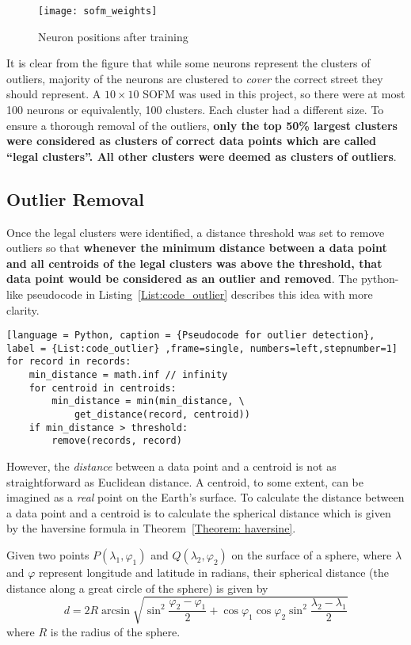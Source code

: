 \begin{figure}[h]
\texttt{[image: sofm\_weights]}
\centering
\caption{Neuron positions after training}\label{Fig:sofm_weights}
\end{figure}

It is clear from the figure that while some neurons represent the clusters of outliers, majority of the neurons are clustered to \emph{cover} the correct street they should represent. A $10\times10$ SOFM was used in this project, so there were at most 100 neurons or equivalently, 100 clusters. Each cluster had a different size. To ensure a thorough removal of the outliers, \textbf{only the top 50\% largest clusters were considered as clusters of correct data points which are called ``legal clusters''. All other clusters were deemed as clusters of outliers}. 

\subsection{Outlier Removal}\label{Subsec:outlier_removal}
Once the legal clusters were identified, a distance threshold was set to remove outliers so that \textbf{whenever the minimum distance between a data point and all centroids of the legal clusters was above the threshold, that data point would be considered as an outlier and removed}. The python-like pseudocode in Listing~\ref{List:code_outlier} describes this idea with more clarity.

\begin{lstlisting}[language = Python, caption = {Pseudocode for outlier detection}, label = {List:code_outlier} ,frame=single, numbers=left,stepnumber=1]
for record in records:
	min_distance = math.inf // infinity
	for centroid in centroids:
		min_distance = min(min_distance, \
			get_distance(record, centroid))
	if min_distance > threshold:
		remove(records, record)
\end{lstlisting}

However, the \emph{distance} between a data point and a centroid is not as straightforward as Euclidean distance. A centroid, to some extent, can be imagined as a \emph{real} point on the Earth's surface. To calculate the distance between a data point and a centroid is to calculate the spherical distance which is given by the haversine formula in Theorem~\ref{Theorem: haversine}. 

\begin{theorem}\label{Theorem: haversine}
Given two points $P(\lambda_1,\varphi_1)$ and $Q(\lambda_2,\varphi_2)$ on the surface of a sphere, where $\lambda$ and $\varphi$ represent longitude and latitude in radians, their spherical distance (the distance along a great circle of the sphere) is given by\cite{FI06}
\begin{equation}
d = 2R\arcsin{\sqrt{\sin^2\frac{\varphi_2 - \varphi_1}{2} + \cos\varphi_1\cos\varphi_2\sin^2\frac{\lambda_2 - \lambda_1}{2}}} 
\end{equation}
where $R$ is the radius of the sphere. 
\end{theorem}

